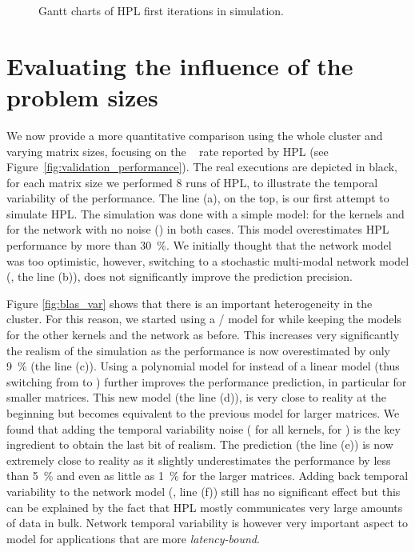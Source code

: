 \begin{figure}[htpb]
\begin{tabular}{c@{}c}
            \end{tabular}
            \caption{Gantt charts of HPL first iterations in simulation.}
            \label{fig:gantt_simulation}
        \end{figure}

    \section{Evaluating the influence of the problem sizes}%
    \label{sec:different_problem_sizes}

        We now provide a more quantitative comparison using the whole cluster and varying matrix sizes, focusing on the
        \si{\giga\flops} rate reported by HPL (see Figure~\ref{fig:validation_performance}).  The real executions are
        depicted in black, for each matrix size we performed 8 runs of HPL, to illustrate the temporal variability of
        the performance.  The line (a), on the top, is our first attempt to simulate HPL. The simulation was done with a
        simple model:  for the kernels and  for the network with no noise () in both cases.
        This model overestimates HPL performance by more than \SI{30}{\percent}. We initially thought that the network
        model was too optimistic, however, switching to a stochastic multi-modal network model (, the line
        (b)), does not significantly improve the prediction precision.

        Figure \ref{fig:blas_var} shows that there is an important heterogeneity in the cluster. For this reason, we
        started using a / model for \dgemm while keeping the models for the other kernels and the
        network as before. This increases very significantly the realism of the simulation as the performance is now
        overestimated by only \SI{9}{\percent} (the line (c)).  Using a polynomial model for \dgemm instead of a linear
        model (thus switching from  to ) further improves the performance prediction, in
        particular for smaller matrices.  This new model (the line (d)), is very close to reality at the beginning but
        becomes equivalent to the previous model for larger matrices.  We found that adding the temporal variability
        noise ( for all kernels,  for \dgemm) is the key ingredient to obtain the last bit of
        realism. The prediction (the line (e)) is now extremely close to reality as it slightly underestimates the
        performance by less than \SI{5}{\percent} and even as little as \SI{1}{\percent} for the larger matrices. Adding
        back temporal variability to the network model (, line (f)) still has no significant effect but this
        can be explained by the fact that HPL mostly communicates very large amounts of data in bulk. Network temporal
        variability is however very important aspect to model for applications that are more \emph{latency-bound}.

